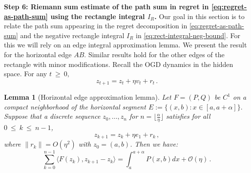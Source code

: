 \documentclass[a4paper,11pt,fullpage]{article}
\theoremstyle{plain}
\newtheorem{lemma}{Lemma}
\theoremstyle{definition}
\theoremstyle{plain}
\renewcommand{\leq}{~\le~}
\renewcommand{\geq}{~\ge~}
\begin{document}
\noindent\textbf{Step 6: Riemann sum estimate of the path sum in regret in \eqref{eq:regret-as-path-sum} using the rectangle integral $I_R$.} Our goal in this section is to relate the path sum appearing in the regret decomposition in \eqref{eq:regret-as-path-sum} and the negative rectangle integral $I_R$ in \eqref{eq:rect-integral-neg-bound}. For this we will rely on an edge integral approximation lemma. We present the result for the horizontal edge $AB$. Similar results hold for the other edges of the rectangle with minor modifications.  
Recall the OGD dynamics in the hidden space. For any $t \geq 0,$ 
\begin{equation*}
z_{t+1} = z_t + \eta v_t + r_t\,.
\end{equation*}

\begin{tcolorbox}[colframe=white!, top=2pt,left=2pt,right=2pt,bottom=2pt] 
\begin{lemma}[Horizontal edge approximation lemma]
\label{lem:horizontal-edge-approx}
Let $F = (P, Q)$ be $C^1$ on a compact neighborhood of the horizontal segment $E := \{ (x,b) : x \in  [a, a+\alpha] \}.$ Suppose that a discrete sequence $z_0, \dots, z_n$ for $n = \lfloor \frac{\alpha}{\eta} \rfloor$ satisfies for all $0 \leq k \leq n-1$, 
\begin{equation}
\label{eq:update-rule-zk-horizontal}
z_{k+1} = z_k + \eta e_1 + r_k\,,
\end{equation}
where $\|r_k\| = O(\eta^2)$ with $z_0 = (a,b)$. Then we have: 
\begin{equation*}
\sum_{k=0}^{n-1} \langle F(z_k), z_{k+1} - z_k \rangle = \int_a^{a+\alpha} P(x,b) dx + \mathcal{O}(\eta)\,.
\end{equation*}
\end{lemma}
\end{tcolorbox}
\end{document}
